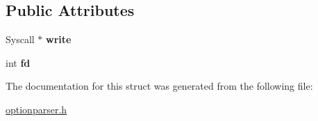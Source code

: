 \subsection*{Public Attributes}
\begin{DoxyCompactItemize}
\item 
\mbox{\label{structoption_1_1_print_usage_implementation_1_1_syscall_writer_adc72b04cd74c69d0219b8b26589b8e5e}} 
Syscall $\ast$ {\bfseries write}
\item 
\mbox{\label{structoption_1_1_print_usage_implementation_1_1_syscall_writer_ae79409e3f85f8dbaa7ef87bb8d7fcf8a}} 
int {\bfseries fd}
\end{DoxyCompactItemize}


The documentation for this struct was generated from the following file\+:\begin{DoxyCompactItemize}
\item 
\hyperlink{optionparser_8h}{optionparser.\+h}\end{DoxyCompactItemize}
